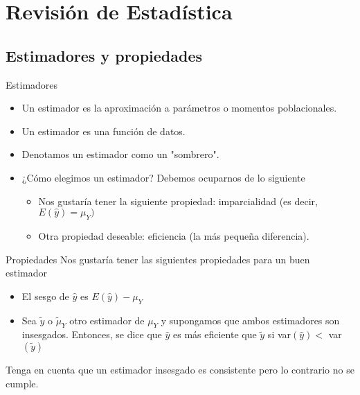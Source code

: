 \section{Revisión de Estadística}

\subsection{Estimadores y propiedades}
\begin{frame}{Estimadores}
	\begin{itemize}
		\item Un estimador es la aproximación a parámetros o momentos poblacionales.
		\item Un estimador es una función de datos.
		\item Denotamos un estimador como un "sombrero".
		\item ¿Cómo elegimos un estimador? Debemos ocuparnos de lo siguiente
			\begin{itemize}
				\item Nos gustaría tener la siguiente propiedad: imparcialidad (es decir, $E (\hat{y}) = \mu_{Y})$
				\item Otra propiedad deseable: eficiencia (la más pequeña
				diferencia).
			\end{itemize}
	\end{itemize}
\end{frame}
\begin{frame}{Propiedades}
	Nos gustaría tener las siguientes propiedades para un buen estimador
		\begin{itemize}
			\item El sesgo de $\hat{y}$ es $E (\hat{y}) - \mu_{Y}$
			\item Sea $\tilde{y}$ o $\tilde{\mu}_{Y}$ otro estimador de $\mu_{Y}$ y supongamos que ambos estimadores son insesgados. Entonces, se dice que $\hat{y}$ es más eficiente que $\tilde{y}$ si var$(\hat{y}) <$ var$(\tilde{y})$
		\end{itemize}
	Tenga en cuenta que un estimador insesgado es consistente pero lo contrario no se cumple.
\end{frame}
